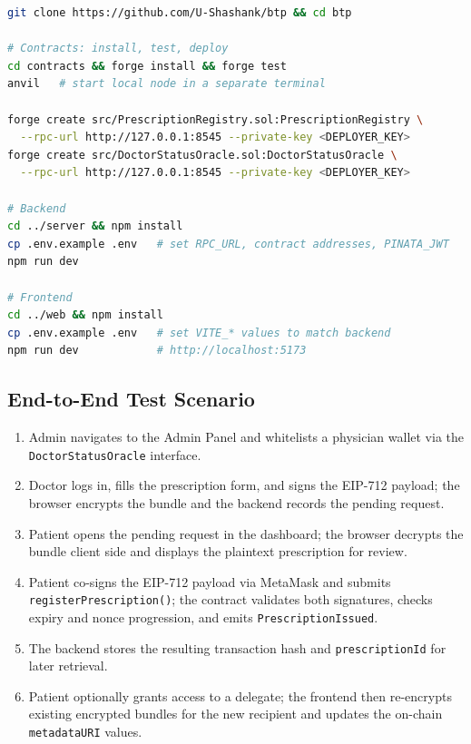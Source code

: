 \documentclass[12pt,a4wide]{report}
\begin{document}
\begin{lstlisting}[language=bash, caption=Full local setup (mirrors the project README)]
git clone https://github.com/U-Shashank/btp && cd btp

# Contracts: install, test, deploy
cd contracts && forge install && forge test
anvil   # start local node in a separate terminal

forge create src/PrescriptionRegistry.sol:PrescriptionRegistry \
  --rpc-url http://127.0.0.1:8545 --private-key <DEPLOYER_KEY>
forge create src/DoctorStatusOracle.sol:DoctorStatusOracle \
  --rpc-url http://127.0.0.1:8545 --private-key <DEPLOYER_KEY>

# Backend
cd ../server && npm install
cp .env.example .env   # set RPC_URL, contract addresses, PINATA_JWT
npm run dev

# Frontend
cd ../web && npm install
cp .env.example .env   # set VITE_* values to match backend
npm run dev            # http://localhost:5173
\end{lstlisting}

\subsection{End-to-End Test Scenario}



\begin{enumerate}
  \item Admin navigates to the Admin Panel and whitelists a physician wallet via the
    \texttt{DoctorStatusOracle} interface.
  \item Doctor logs in, fills the prescription form, and signs the EIP-712 payload;
    the browser encrypts the bundle and the backend records the pending request.
  \item Patient opens the pending request in the dashboard; the browser decrypts
    the bundle client side and displays the plaintext prescription for review.
  \item Patient co-signs the EIP-712 payload via MetaMask and submits
    \texttt{registerPrescription()}; the contract validates both signatures,
    checks expiry and nonce progression, and emits \texttt{PrescriptionIssued}.
  \item The backend stores the resulting transaction hash and \texttt{prescriptionId}
    for later retrieval.
  \item Patient optionally grants access to a delegate; the frontend then
    re-encrypts existing encrypted bundles for the new recipient and updates the
    on-chain \texttt{metadataURI} values.
\end{enumerate}
\end{document}

